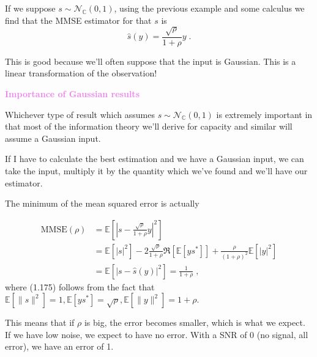 \documentclass[a4paper, 12pt]{book}
\begin{document}
\vspace{1em}

If we suppose $s \sim \mathcal{N}_{\mathbb{C}}(0,1)$, using the previous example and some calculus we find that the MMSE estimator for that $s$ is
\begin{equation}
\hat{s}(y) = \frac{\sqrt{\rho}}{1+\rho}y \;. \tag{1.172}
\end{equation}

\begin{tcolorbox}[sharp corners, boxrule=0pt, leftrule=2pt, colframe=green!60!black, colback=green!5, left=5pt, top=3pt, bottom=3pt]
    This is good because we'll often suppose that the input is Gaussian.
    This is a linear transformation of the observation!
\end{tcolorbox}

\vspace{0.5em}

\begin{tcolorbox}[colframe=violet!80!white, colback=white, boxrule=1pt, arc=2pt]
    \textcolor{violet}{\textbf{Importance of Gaussian results}}

    Whichever type of result which assumes $s \sim \mathcal{N}_{\mathbb{C}}(0,1)$ is extremely important in that most of the information theory we'll derive for capacity and similar will assume a Gaussian input.
\end{tcolorbox}

If I have to calculate the best estimation and we have a Gaussian input, we can take the input, multiply it by the quantity which we've found and we'll have our estimator.

The minimum of the mean squared error is actually


\begin{align}
\text{MMSE}(\rho) &= \mathbb{E}\left[ \left| s - \frac{\sqrt{\rho}}{1+\rho}y \right|^2 \right] \tag{1.173} \\
&= \mathbb{E}[|s|^2] - 2 \frac{\sqrt{\rho}}{1+\rho} \Re[\mathbb{E}[ys^*]] + \frac{\rho}{(1+\rho)^2}\mathbb{E}[|y|^2] \tag{1.174} \\
&= \mathbb{E}[|s - \hat{s}(y)|^2] = \frac{1}{1+\rho} \;, \tag{1.175}
\end{align}
where (1.175) follows from the fact that $\mathbb{E}[\|s\|^2] = 1, \mathbb{E}[ys^*] = \sqrt{\rho}, \mathbb{E}[\|y\|^2] = 1+\rho$.

This means that if $\rho$ is big, the error becomes smaller, which is what we expect.
If we have low noise, we expect to have no error.
With a SNR of 0 (no signal, all error), we have an error of 1.
\end{document}
